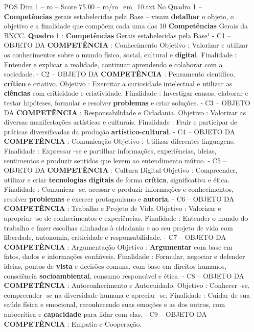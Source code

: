 \begin{textsample}{POS Dim 1 – ro – Score 75.00 – ro/ro\_em\_10.txt}
No Quadro 1 – \textbf{Competências} gerais estabelecidas pela Base – visam \textbf{detalhar} o objeto, o objetivo e a finalidade que compõem cada uma das 10 \textbf{Competências} Gerais da BNCC. \textbf{Quadro} 1 : \textbf{Competências} Gerais estabelecidas pela Base¹ - C1 – OBJETO DA \textbf{COMPETÊNCIA} : Conhecimento Objetivo : Valorizar e utilizar os conhecimentos sobre o mundo físico, social, cultural e \textbf{digital}.
Finalidade : Entender e explicar a realidade, continuar aprendendo e colaborar com a sociedade. - C2 – OBJETO DA \textbf{COMPETÊNCIA} : Pensamento científico, \textbf{crítico} e criativo.
Objetivo : Exercitar a curiosidade intelectual e utilizar as \textbf{ciências} com criticidade e criatividade.
Finalidade : Investigar causas, elaborar e testar hipóteses, formular e resolver \textbf{problemas} e criar soluções. - C3 – OBJETO DA \textbf{COMPETÊNCIA} : Responsabilidade e Cidadania.
Objetivo : Valorizar as diversas manifestações artísticas e culturais.
Finalidade : Fruir e participar de práticas diversificadas da produção \textbf{artístico-cultural}. - C4 – OBJETO DA \textbf{COMPETÊNCIA} : Comunicação Objetivo : Utilizar diferentes linguagens.
Finalidade : Expressar -se e partilhar informações, experiências, ideias, sentimentos e produzir sentidos que levem ao entendimento mútuo. - C5 – OBJETO DA \textbf{COMPETÊNCIA} : Cultura Digital Objetivo : Compreender, utilizar e criar \textbf{tecnologias} \textbf{digitais} de forma \textbf{crítica}, significativa e ética.
Finalidade : Comunicar -se, acessar e produzir informações e conhecimentos, resolver \textbf{problemas} e exercer protagonismo e \textbf{autoria}. - C6 – OBJETO DA \textbf{COMPETÊNCIA} : Trabalho e Projeto de Vida Objetivo : Valorizar e apropriar -se de conhecimentos e experiências.
Finalidade : Entender o mundo do trabalho e fazer escolhas alinhadas à cidadania e ao seu projeto de vida com liberdade, autonomia, criticidade e responsabilidade. - C7 – OBJETO DA \textbf{COMPETÊNCIA} : Argumentação Objetivo : \textbf{Argumentar} com base em fatos, dados e informações confiáveis.
Finalidade : Formular, negociar e defender ideias, pontos de \textbf{vista} e decisões comuns, com base em direitos humanos, consciência \textbf{socioambiental}, consumo responsável e ética. - C8 – OBJETO DA \textbf{COMPETÊNCIA} : Autoconhecimento e Autocuidado.
Objetivo : Conhecer -se, compreender -se na diversidade humana e apreciar -se.
Finalidade : Cuidar de sua saúde física e emocional, reconhecendo suas emoções e as dos outros, com autocrítica e \textbf{capacidade} para lidar com elas. - C9 – OBJETO DA \textbf{COMPETÊNCIA} : Empatia e Cooperação.

\end{textsample}
